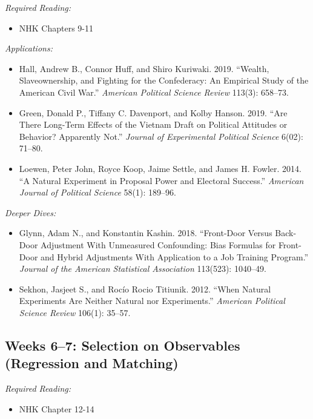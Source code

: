 \documentclass[11pt, letterpaper]{article}
\begin{document}
\textit{Required Reading:}

\begin{itemize}
	\item NHK Chapters 9-11

\end{itemize}

\noindent \textit{Applications:}

\begin{itemize}
	\item Hall, Andrew B., Connor Huff, and Shiro Kuriwaki. 2019. ``Wealth, Slaveownership, and Fighting for the Confederacy: An Empirical Study of the American Civil War.'' \textit{American Political Science Review} 113(3): 658–73.
	\item Green, Donald P., Tiffany C. Davenport, and Kolby Hanson. 2019. ``Are There Long-Term Effects of the Vietnam Draft on Political Attitudes or Behavior? Apparently Not.'' \textit{Journal of Experimental Political Science} 6(02): 71–80.
	\item Loewen, Peter John, Royce Koop, Jaime Settle, and James H. Fowler. 2014. “A Natural Experiment in Proposal Power and Electoral Success.” \textit{American Journal of Political Science} 58(1): 189–96.
\end{itemize}

\noindent \textit{Deeper Dives:}

\begin{itemize}
	\item Glynn, Adam N., and Konstantin Kashin. 2018. ``Front-Door Versus Back-Door Adjustment With Unmeasured Confounding: Bias Formulas for Front-Door and Hybrid Adjustments With Application to a Job Training Program.'' \textit{Journal of the American Statistical Association} 113(523): 1040–49.
	\item Sekhon, Jasjeet S., and Rocío Rocio Titiunik. 2012. ``When Natural Experiments Are Neither Natural nor Experiments.'' \textit{American Political Science Review} 106(1): 35–57.
\end{itemize}

\subsection*{Weeks 6--7: Selection on Observables (Regression and Matching)}

\textit{Required Reading:}

\begin{itemize}
	\item NHK Chapter 12-14
\end{itemize}
\end{document}
